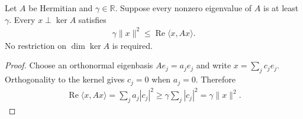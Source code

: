 \begin{theorem}
    \label{thm:quadratic_gap_off_kernel}
    \leanok
    Let $A$ be Hermitian and $\gamma\in\mathbb R$. Suppose every nonzero
    eigenvalue of $A$ is at least $\gamma$. Every $x\perp\ker A$ satisfies
    \begin{align}
        \gamma\|x\|^2\leq\operatorname{Re}\langle x,Ax\rangle.
        \label{eq:quadratic_gap_off_kernel}
    \end{align}
    No restriction on $\dim\ker A$ is required.
\end{theorem}
\begin{proof}\leanok
    Choose an orthonormal eigenbasis $Ae_j=a_j e_j$ and write $x=\sum_j c_j e_j$.
    Orthogonality to the kernel gives $c_j=0$ when $a_j=0$. Therefore
    \begin{align}
        \operatorname{Re}\langle x,Ax\rangle
        =\sum_j a_j|c_j|^2
        \geq\gamma\sum_j|c_j|^2=\gamma\|x\|^2.
    \end{align}
\end{proof}
